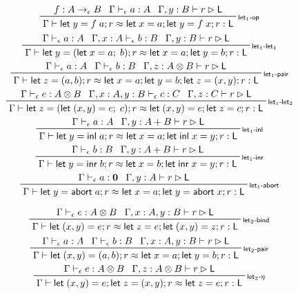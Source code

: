 \documentclass[acmsmall,screen,review]{acmart}
\newcommand{\mb}[1]{\ensuremath{\mathbf{#1}}}
\newcommand{\ms}[1]{\ensuremath{\mathsf{#1}}}
\newcommand{\linl}[1]{\ms{inl}\;{#1}}
\newcommand{\linr}[1]{\ms{inr}\;{#1}}
\newcommand{\labort}[1]{\ms{abort}\;{#1}}
\newcommand{\letexpr}[3]{\ensuremath{\ms{let}\;#1 = #2;\;#3}}
\newcommand{\letstmt}[3]{\ensuremath{\ms{let}\;#1 = #2; #3}}
\newcommand{\bhyp}[2]{#1 : #2}
\newcommand{\rle}[1]{{\scriptsize\textsf{#1}}}
\newcommand{\hasty}[4]{#1 \vdash_{#2} #3: {#4}}
\newcommand{\haslb}[3]{#1 \vdash #2 \rhd #3}
\newcommand{\isop}[4]{#1: #2 \to_{#4} #3}
\newcommand{\teqv}{\approx}
\newcommand{\lbeq}[4]{#1 \vdash #2 \teqv #3 : {#4}}
\begin{document}
\begin{gather*}
  \prftree[r]{\rle{let$_1$-op}}
    {\isop{f}{A}{B}{\epsilon}}
    {\hasty{\Gamma}{\epsilon}{a}{A}}
    {\haslb{\Gamma, \bhyp{y}{B}}{r}{\ms{L}}}
    {\lbeq{\Gamma}{\letstmt{y}{f\;a}{r}}{\letstmt{x}{a}{\letstmt{y}{f\;x}{r}}}{\ms{L}}}
  \\
  \prftree[r]{\rle{let$_{1}$-let$_1$}}
    {\hasty{\Gamma}{\epsilon}{a}{A}}
    {\hasty{\Gamma, \bhyp{x}{A}}{\epsilon}{b}{B}}
    {\haslb{\Gamma, \bhyp{y}{B}}{r}{\ms{L}}}
    {\lbeq{\Gamma}{\letstmt{y}{(\letexpr{x}{a}{b})}{r}}{\letstmt{x}{a}{\letstmt{y}{b}{r}}}{\ms{L}}}
  \\
  \prftree[r]{\rle{let$_1$-pair}}
    {\hasty{\Gamma}{\epsilon}{a}{A}}
    {\hasty{\Gamma}{\epsilon}{b}{B}}
    {\haslb{\Gamma, \bhyp{z}{A \otimes B}}{r}{\ms{L}}}
    {\lbeq{\Gamma}
      {\letstmt{z}{(a, b)}{r}}
      {\letstmt{x}{a}{\letstmt{y}{b}{\letstmt{z}{(x, y)}{r}}}}
      {\ms{L}}}
  \\
  \prftree[r]{\rle{let$_{1}$-let$_2$}}
    {\hasty{\Gamma}{\epsilon}{e}{A \otimes B}}
    {\hasty{\Gamma, \bhyp{x}{A}, \bhyp{y}{B}}{\epsilon}{c}{C}}
    {\haslb{\Gamma, \bhyp{z}{C}}{r}{\ms{L}}}
    {\lbeq{\Gamma}
      {\letstmt{z}{(\letexpr{(x, y)}{e}{c})}{r}}
      {\letstmt{(x, y)}{e}{\letstmt{z}{c}{r}}}
      {\ms{L}}}
  \\
  \prftree[r]{\rle{let$_1$-inl}}
    {\hasty{\Gamma}{\epsilon}{a}{A}}
    {\haslb{\Gamma, \bhyp{y}{A + B}}{r}{\ms{L}}}
    {\lbeq{\Gamma}{\letstmt{y}{\linl{a}}{r}}{\letstmt{x}{a}{\letstmt{\linl{x}}{y}{r}}}{\ms{L}}}
  \\
  \prftree[r]{\rle{let$_1$-inr}}
    {\hasty{\Gamma}{\epsilon}{b}{B}}
    {\haslb{\Gamma, \bhyp{y}{A + B}}{r}{\ms{L}}}
    {\lbeq{\Gamma}{\letstmt{y}{\linr{b}}{r}}{\letstmt{x}{b}{\letstmt{\linr{x}}{y}{r}}}{\ms{L}}}
  \\
  \prftree[r]{\rle{let$_1$-abort}}
    {\hasty{\Gamma}{\epsilon}{a}{\mb{0}}}
    {\haslb{\Gamma, \bhyp{y}{A}}{r}{\ms{L}}}
    {\lbeq{\Gamma}{\letstmt{y}{\labort{a}}{r}}{\letstmt{x}{a}{\letstmt{y}{\labort{x}}{r}}}{\ms{L}}}
\end{gather*}

\begin{gather*}
  \prftree[r]{\rle{let$_2$-bind}}
    {\hasty{\Gamma}{\epsilon}{e}{A \otimes B}}
    {\haslb{\Gamma, \bhyp{x}{A}, \bhyp{y}{B}}{r}{\ms{L}}}
    {\lbeq{\Gamma}{\letstmt{(x, y)}{e}{r}}{\letstmt{z}{e}{\letstmt{(x, y)}{z}{r}}}{\ms{L}}}
  \\
  \prftree[r]{\rle{let$_2$-pair}}
    {\hasty{\Gamma}{\epsilon}{a}{A}}
    {\hasty{\Gamma}{\epsilon}{b}{B}}
    {\haslb{\Gamma, \bhyp{x}{A}, \bhyp{y}{B}}{r}{\ms{L}}}
    {\lbeq{\Gamma}{\letstmt{(x, y)}{(a, b)}{r}}{\letstmt{x}{a}{\letstmt{y}{b}{r}}}{\ms{L}}}
  \\
  \prftree[r]{\rle{let$_2$-$\eta$}}
    {\hasty{\Gamma}{\epsilon}{e}{A \otimes B}}
    {\haslb{\Gamma, \bhyp{z}{A \otimes B}}{r}{\ms{L}}}
    {\lbeq{\Gamma}{\letstmt{(x, y)}{e}{\letstmt{z}{(x, y)}{r}}}{\letstmt{z}{e}{r}}{\ms{L}}}
\end{gather*}
\end{document}
